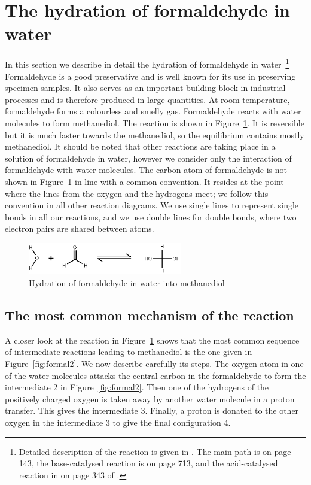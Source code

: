 \section{The hydration of formaldehyde in water}
\label{sec:bigexample}

In this section we describe in detail the hydration of formaldehyde in 
water~\footnote{Detailed description of the reaction is given in \cite{claydon}. 
The main path is on page 143, the base-catalysed  reaction is on page 713, and 
the acid-catalysed reaction in on page 343 of \cite{claydon}.} Formaldehyde 
is a good preservative and is well known for its use in preserving specimen samples. 
It also serves as an important building block in industrial processes and is therefore 
produced in large quantities. At room temperature, formaldehyde forms a colourless and smelly gas. 
Formaldehyde reacts with water molecules to form methanediol. The reaction is shown in 
Figure~\ref{fig:formal1}. It is reversible but it is much faster towards the methanediol, so 
the equilibrium contains mostly methanediol. It should be noted that other reactions are 
taking place in a solution of formaldehyde in water, however we consider only the interaction 
of formaldehyde with water molecules. The carbon atom of formaldehyde is not shown in 
Figure~\ref{fig:formal1} in line with a common convention. It resides at the point where 
the lines from the oxygen and the hydrogens
meet; we follow this convention in all other reaction diagrams. 
We use single lines to represent single bonds in all our reactions, and we use
double lines for double bonds, where two electron pairs are shared between atoms.

\begin{figure}[h!]
  \centering
    \includegraphics[width=0.6\textwidth]{formaldehyde1}
  \caption{Hydration of formaldehyde in water into methanediol}
  \label{fig:formal1}
\end{figure}

\subsection{The most common mechanism of the reaction}

A closer look at the reaction in Figure~\ref{fig:formal1} shows that the most common sequence 
of intermediate reactions leading to methanediol is the one given in Figure~\ref{fig:formal2}.
We now describe carefully its steps. The oxygen atom in one of the water molecules attacks the central 
carbon in the formaldehyde to form the intermediate 2 in Figure~\ref{fig:formal2}. Then one 
of the hydrogens of the positively charged oxygen is taken away by another water molecule 
in a proton transfer. This gives the intermediate 3. Finally, a proton is donated to the other 
oxygen in the intermediate 3 to give the final configuration 4.

